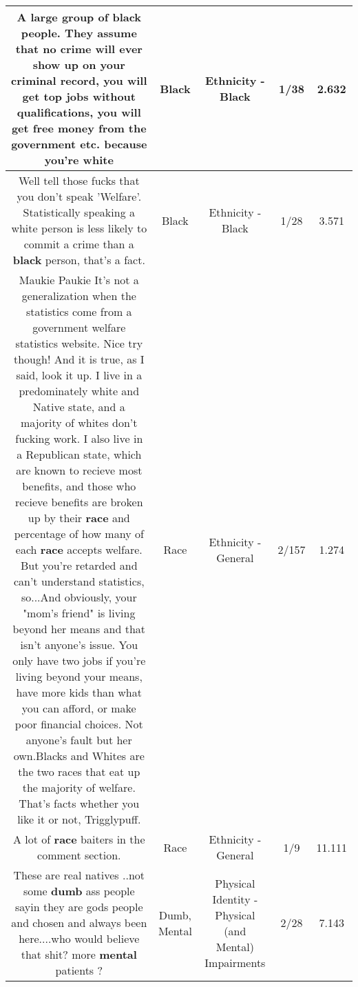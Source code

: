 \documentclass[11pt]{article}
\newlength\mylength
\begin{document}
\begin{center}
\begin{longtable}{|C{.65\mylength}|C{.30\mylength}|C{.12\mylength}|C{.12\mylength}|C{.12\mylength}|}
  \small A large group of \textbf{black} people. They assume that no crime will ever show up on your criminal record, you will get top jobs without qualifications, you will get free money from the government etc. because you're white\normalsize   & Black & Ethnicity - Black & 1/38 & 2.632 \\  \hline
  \small Well tell those fucks that you don't speak 'Welfare'. Statistically speaking a white person is less likely to commit a crime than a \textbf{black} person, that's a fact.\normalsize   & Black & Ethnicity - Black & 1/28 & 3.571 \\  \hline
  \small Maukie Paukie It's not a generalization when the statistics come from a government welfare statistics website. Nice try though! And it is true, as I said, look it up. I live in a predominately white and Native state, and a majority of whites don't fucking work. I also live in a Republican state, which are known to recieve most benefits, and those who recieve benefits are broken up by their \textbf{race} and percentage of how many of each \textbf{race} accepts welfare. But you're retarded and can't understand statistics, so...And obviously, your "mom's friend" is living beyond her means and that isn't anyone's issue. You only have two jobs if you're living beyond your means, have more kids than what you can afford, or make poor financial choices. Not anyone's fault but her own.Blacks and Whites are the two races that eat up the majority of welfare. That's facts whether you like it or not, Trigglypuff.\normalsize   & Race & Ethnicity - General & 2/157 & 1.274 \\  \hline
  \small A lot of \textbf{race} baiters in the comment section.\normalsize   & Race & Ethnicity - General & 1/9 & 11.111 \\  \hline
  \small These are real natives ..not some \textbf{dumb} ass people sayin they are gods people and chosen and always been here....who would believe that shit? more \textbf{mental} patients ?\normalsize   & Dumb, Mental & Physical Identity - Physical (and Mental) Impairments & 2/28 & 7.143 \\  \hline

\end{longtable}
\end{center}
\end{document}
